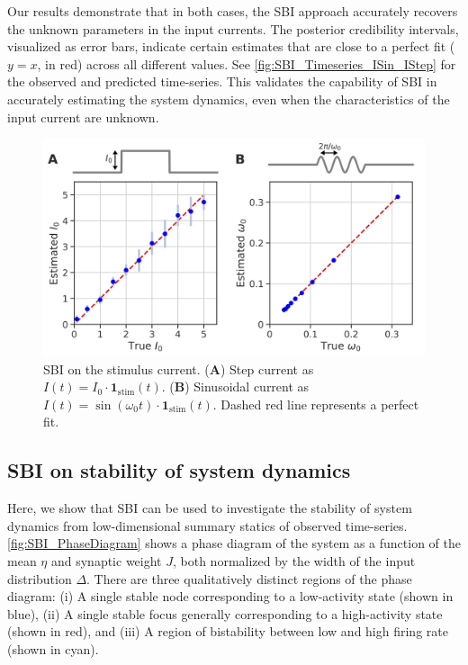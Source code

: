 \documentclass[preprint,11pt,authoryear]{elsarticle}
\begin{document}
Our results demonstrate that in both cases, the SBI approach accurately recovers the unknown parameters in the input currents. The posterior credibility intervals, visualized as error bars, indicate certain estimates that are close to a perfect fit ($y=x$, in red) across all different values. See \autoref{fig:SBI_Timeseries_ISin_IStep} for the observed and predicted time-series. This validates the capability of SBI in accurately estimating the system dynamics, even when the characteristics of the input current are unknown.


\begin{figure}
    \centering
    \includegraphics[width=0.7\linewidth]{Figs/Fig7.png}
    \caption{SBI on the stimulus current. (\textbf{A}) Step current as $I(t)=I_0 \cdot \mathbf{1}_{\text{stim}}(t)$. (\textbf{B}) Sinusoidal current as $I(t)=\sin (\omega_0 t) \cdot \mathbf{1}_{\text{stim}}(t)$. Dashed red line represents a perfect fit.  }
    \label{fig:SBI_stimulus}
\end{figure}



\subsection{SBI on stability of system dynamics}

Here, we show that SBI can be used to investigate the stability of system dynamics from low-dimensional summary statics of observed time-series. \autoref{fig:SBI_PhaseDiagram} shows a phase diagram of the system as a function of the mean $\eta$ and synaptic weight $J$, both normalized by the width of the input distribution $\Delta$. There are three qualitatively distinct regions of the phase diagram: (i) A single stable node corresponding to a low-activity state (shown in blue), (ii) A single stable focus generally corresponding to a high-activity state (shown in red), and (iii) A region of bistability between low and high firing rate (shown in cyan).  
\end{document}

